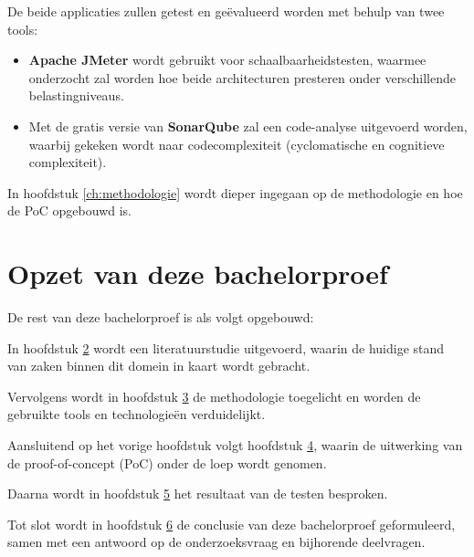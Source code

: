 De beide applicaties zullen getest en geëvalueerd worden met behulp van twee tools:

\begin{itemize}
	\item \textbf{Apache JMeter} wordt gebruikt voor schaalbaarheidstesten, waarmee onderzocht zal worden hoe beide architecturen presteren onder verschillende belastingniveaus.
	\item Met de gratis versie van \textbf{SonarQube} zal een code-analyse uitgevoerd worden, waarbij gekeken wordt naar codecomplexiteit (cyclomatische en cognitieve complexiteit).
\end{itemize}

In hoofdstuk \ref{ch:methodologie} wordt dieper ingegaan op de methodologie en hoe de PoC opgebouwd is.

\section{Opzet van deze bachelorproef}

De rest van deze bachelorproef is als volgt opgebouwd:

In hoofdstuk \hyperref[ch:stand-van-zaken]{2} wordt een literatuurstudie uitgevoerd, waarin de huidige stand van zaken binnen dit domein in kaart wordt gebracht.

Vervolgens wordt in hoofdstuk \hyperref[ch:methodologie]{3} de methodologie toegelicht en worden de gebruikte tools en technologieën verduidelijkt.

Aansluitend op het vorige hoofdstuk volgt hoofdstuk \hyperref[ch:uitwerking]{4}, waarin de uitwerking van de proof-of-concept (PoC) onder de loep wordt genomen.

Daarna wordt in hoofdstuk \hyperref[ch:resultaten]{5} het resultaat van de testen besproken.

Tot slot wordt in hoofdstuk \hyperref[ch:conclusie]{6} de conclusie van deze bachelorproef geformuleerd, samen met een antwoord op de onderzoeksvraag en bijhorende deelvragen.



